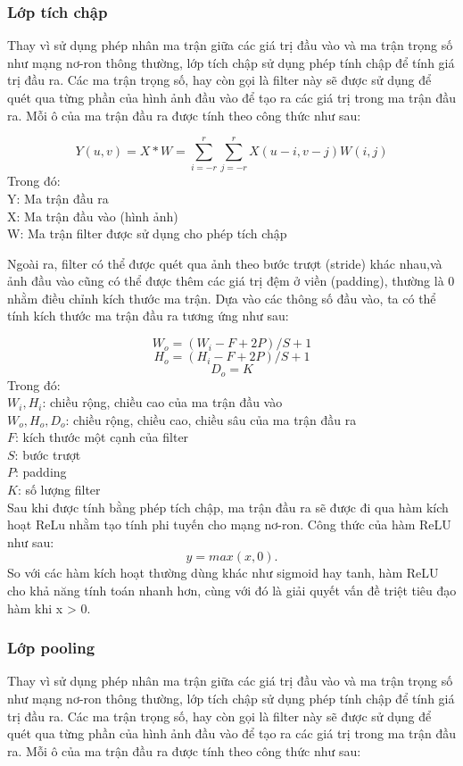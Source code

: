\documentclass[a4paper,14pt]{extreport}
\begin{document}
\subsubsection*{Lớp tích chập}
Thay vì sử dụng phép nhân ma trận giữa các giá trị đầu vào và ma trận trọng số như mạng nơ-ron thông thường, 
lớp tích chập sử dụng phép tính chập để tính giá trị đầu ra. Các ma trận trọng số, hay còn gọi là filter 
này sẽ được sử dụng để quét qua từng phần của hình ảnh đầu vào để tạo ra các giá trị trong ma trận đầu ra.  
Mỗi ô của ma trận đầu ra được tính theo công thức như sau:

\[ Y(u,v) = X*W = \sum_{i=-r}^{r} \sum_{j=-r}^{r} X(u - i,v - j)W(i,j) \]
Trong đó: \\
Y: Ma trận đầu ra \\
X: Ma trận đầu vào (hình ảnh) \\
W: Ma trận filter được sử dụng cho phép tích chập

Ngoài ra, filter có thể được quét qua ảnh theo bước trượt (stride) khác nhau,và ảnh đầu vào cũng có thể được thêm các giá trị đệm ở viền (padding), thường là 0 nhằm điều chỉnh kích thước ma trận. Dựa vào các thông số đầu vào, ta có thể tính kích thước ma trận đầu ra tương ứng như sau:

\[ W_o = (W_i - F + 2P) / S + 1 \]
\[ H_o = (H_i - F + 2P) / S + 1 \]
\[ D_o = K \]
Trong đó: \\
$ W_i, H_i $: chiều rộng, chiều cao của ma trận đầu vào \\
$ W_o, H_o, D_o $: chiều rộng, chiều cao, chiều sâu của ma trận đầu ra \\
$ F $: kích thước một cạnh của filter \\
$ S $: bước trượt \\
$ P $: padding \\
$ K $: số lượng filter \\

Sau khi được tính bằng phép tích chập, ma trận đầu ra sẽ được đi qua hàm kích hoạt ReLu nhằm tạo 
tính phi tuyến cho mạng nơ-ron. Công thức của hàm ReLU như sau:
\[ y = max(x, 0). \]
So với các hàm kích hoạt thường dùng khác như sigmoid hay tanh, hàm ReLU cho khả năng tính toán nhanh hơn, 
cùng với đó là giải quyết vấn đề triệt tiêu đạo hàm khi x > 0.

\subsubsection*{Lớp pooling}

Thay vì sử dụng phép nhân ma trận giữa các giá trị đầu vào và ma trận trọng số như mạng nơ-ron thông thường, 
lớp tích chập sử dụng phép tính chập để tính giá trị đầu ra. Các ma trận trọng số, hay còn gọi là filter 
này sẽ được sử dụng để quét qua từng phần của hình ảnh đầu vào để tạo ra các giá trị trong ma trận đầu ra.  
Mỗi ô của ma trận đầu ra được tính theo công thức như sau:
\end{document}
